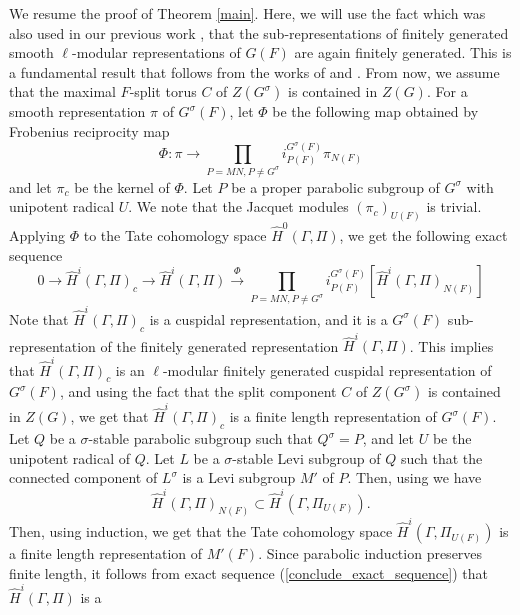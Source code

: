\documentclass[10pt, reqno]{amsart}
\theoremstyle{plain}
\numberwithin{equation}{section}
\begin{document}
We resume the proof of Theorem \ref{main}. Here, we will use the fact
which was also used in our previous work \cite[Theorem 2.3]
{dhar2025jacquetmodulestatecohomology}, that the sub-representations
of finitely generated smooth $\ell$-modular representations of $G(F)$
are again finitely generated. This is a fundamental result that
follows from the works of \cite[Corollary 1.3]{DHMK_finiteness} and
\cite[Corollary 4.5] {Dat_finiteness_p_adic}.  From now, we assume
that the maximal $F$-split torus $C$ of $Z(G^\sigma)$ is contained in
$Z(G)$.  For a smooth representation $\pi$ of $G^\sigma(F)$, let
$\Phi$ be the following map obtained by Frobenius reciprocity map
 $$\Phi:\pi\rightarrow \prod_{P=MN, P\neq 
   G^\sigma}i_{P(F)}^{G^\sigma(F)}\pi_{N(F)}$$ and let $\pi_c$ be the
 kernel of $\Phi$. Let $P$ be a proper parabolic subgroup of
 $G^\sigma$ with unipotent radical $U$. We note that the Jacquet
 modules $({\pi_c})_{U(F)}$ is trivial. Applying $\Phi$ to the Tate
 cohomology space $\widehat{H}^0(\Gamma, \Pi)$, we get the following
 exact sequence
 \begin{equation}\label{conclude_exact_sequence}
   0\rightarrow  \widehat{H}^i(\Gamma, \Pi)_c\rightarrow
   \widehat{H}^i(\Gamma, \Pi)\xrightarrow{\Phi}
   \prod_{P=MN, P\neq G^\sigma}i_{P(F)}^{G^\sigma(F)}[\widehat{H}^i(\Gamma, \Pi)_{N(F)}]
\end{equation}
Note that $\widehat{H}^i(\Gamma, \Pi)_c$ is a cuspidal representation,
and it is a $G^\sigma(F)$ sub-representation of the finitely generated
representation $\widehat{H}^i(\Gamma, \Pi)$.  This implies that
$\widehat{H}^i(\Gamma, \Pi)_c$ is an $\ell$-modular finitely generated
cuspidal representation of $G^\sigma(F)$, and using the fact that the
split component $C$ of $Z(G^\sigma)$ is contained in $Z(G)$, we get
that $\widehat{H}^i(\Gamma, \Pi)_c$ is a finite length representation
of $G^\sigma(F)$.  Let $Q$ be a $\sigma$-stable parabolic subgroup
such that $Q^\sigma=P$, and let $U$ be the unipotent radical of
$Q$. Let $L$ be a $\sigma$-stable Levi subgroup of $Q$ such that the
connected component of $L^\sigma$ is a Levi subgroup $M'$ of
$P$. Then, using \cite[Theorem
3.3.2]{dhar2025jacquetmodulestatecohomology} we have
$$ \widehat{H}^i(\Gamma, \Pi)_{N(F)}\subset 
\widehat{H}^i(\Gamma, \Pi_{U(F)}). $$ Then, using induction, we get
that the Tate cohomology space $\widehat{H}^i(\Gamma, \Pi_{U(F)})$ is
a finite length representation of $M'(F)$. Since parabolic induction
preserves finite length, it follows from exact sequence
(\ref{conclude_exact_sequence}) that $\widehat{H}^i(\Gamma, \Pi)$ is a
\end{document}
